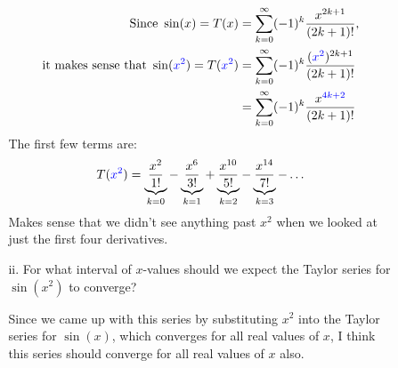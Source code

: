\documentclass[10pt]{article}
\newenvironment{red}{\color{red}}{\ignorespacesafterend}
\begin{document}
\begin{enumerate}[leftmargin=0pt]
\begin{enumerate}
\begin{enumerate}
        \begin{red}
        \begin{align*}
            \text{Since } \sin(x) = T(x) &= \sum_{k=0}^{\infty} (-1)^{k} \frac{x^{2k+1}}{(2k+1)!}\text{,} \\
            \text{it makes sense that } \sin({\color{blue} x^2}) = T({\color{blue} x^2}) &= \sum_{k=0}^{\infty} (-1)^{k} \frac{({\color{blue} x^2})^{2k+1}}{(2k+1)!} \\
            &= \sum_{k=0}^{\infty} (-1)^{k} \frac{x^{\color{blue} 4k+2}}{(2k+1)!}
        \end{align*}
        The first few terms are:
        \[T({\color{blue}x^2}) = \underbrace{\dfrac{x^2}{1!}}_{k=0} - \underbrace{\dfrac{x^6}{3!}}_{k=1} + \underbrace{\dfrac{x^{10}}{5!}}_{k=2} - \underbrace{\dfrac{x^{14}}{7!}}_{k=3} - \ldots\]
        Makes sense that we didn't see anything past $x^2$ when we looked at just the first four derivatives.
        \end{red}

        \item[ii.] For what interval of $x$-values should we expect the Taylor series for $\sin(x^2)$ to converge?

        \begin{red}
            Since we came up with this series by substituting $x^2$ into the Taylor series for $\sin(x)$, which converges for all real values of $x$, I think this series should converge for all real values of $x$ also.
        \end{red}
    \end{enumerate}
    \end{enumerate}


\end{enumerate}
\end{document}
